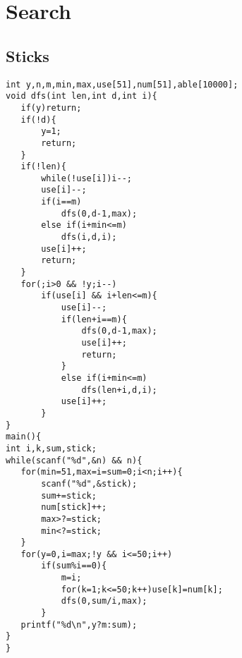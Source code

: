 \documentclass[9pt,a4paper,twocolumn,oneside]{article}
\begin{document}
\section{Search}

\subsection{Sticks}
\begin{verbatim}
int y,n,m,min,max,use[51],num[51],able[10000];
void dfs(int len,int d,int i){
   if(y)return;
   if(!d){
       y=1;
       return;
   }
   if(!len){
       while(!use[i])i--;
       use[i]--;
       if(i==m)
           dfs(0,d-1,max);
       else if(i+min<=m)
           dfs(i,d,i);
       use[i]++;
       return;
   }
   for(;i>0 && !y;i--)
       if(use[i] && i+len<=m){
           use[i]--;
           if(len+i==m){
               dfs(0,d-1,max);
               use[i]++;
               return;
           }
           else if(i+min<=m)
               dfs(len+i,d,i);
           use[i]++;
       }
}
main(){
int i,k,sum,stick;
while(scanf("%d",&n) && n){
   for(min=51,max=i=sum=0;i<n;i++){
       scanf("%d",&stick);
       sum+=stick;
       num[stick]++;
       max>?=stick;
       min<?=stick;
   }
   for(y=0,i=max;!y && i<=50;i++)
       if(sum%i==0){
           m=i;
           for(k=1;k<=50;k++)use[k]=num[k];
           dfs(0,sum/i,max);
       }
   printf("%d\n",y?m:sum);
}
}
\end{verbatim}
\end{document}
